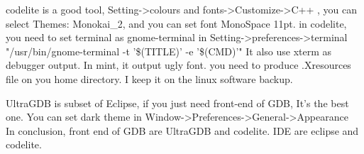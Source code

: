\documentclass[a4paper,12pt,twoside]{book}
\begin{document}
codelite is a good tool, Setting->colours and fonts->Customize->C++ , you can select Themes: Monokai\_2, and you can set font MonoSpace 11pt.  
in codelite, you need to set terminal as gnome-terminal in Setting->preferences->terminal "/usr/bin/gnome-terminal -t '\$(TITLE)' -e '\$(CMD)'"
It also use xterm as debugger output. In mint, it output ugly font.  you need to produce .Xresources file on you home directory.  I keep it on the linux software backup. 

UltraGDB is subset of Eclipse, if you just need front-end of GDB, It's the best one. You can set dark theme in Window->Preferences->General->Appearance \\

In conclusion,  front end of GDB are UltraGDB and codelite. IDE are eclipse and codelite.
\end{document}

